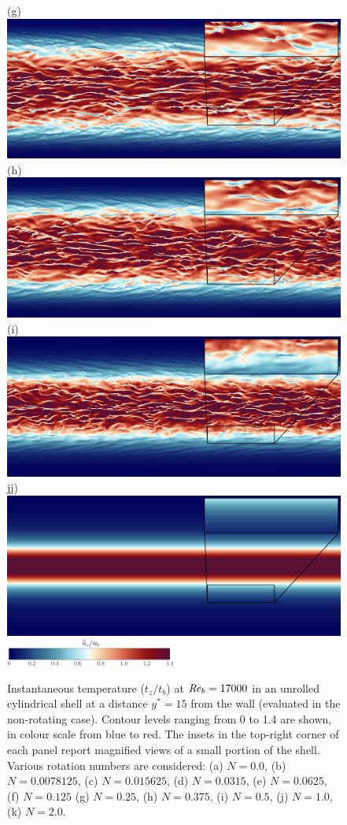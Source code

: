 \documentclass[lineno]{jfm}
\begin{document}
\begin{figure}
                (g) \includegraphics[width=6.cm]{Figures/unrolled_rotz0_roty0.1875_T.png} \\ 
                (h) \includegraphics[width=6.cm]{Figures/unrolled_rotz0_roty0.25_T.png} 
                (i) \includegraphics[width=6.cm]{Figures/unrolled_rotz0_roty0.5_T.png} \\
                jj) \includegraphics[width=6.cm]{Figures/unrolled_rotz0_roty1.0_T.png} 
		\\ \includegraphics[width=0.5\textwidth]{Figures/uz_cmap.eps}
		\caption{
			Instantaneous temperature ($t_z/t_b$) at $\mbox{\textit{Re}}_b = 17000$
			in an unrolled cylindrical shell at a distance
			$y^*=15$ from the wall (evaluated in the non-rotating case).
			Contour levels ranging from 0 to 1.4 are shown,
			in colour scale from blue to red. 
			The insets in the top-right corner of each panel report magnified views of a small portion of the shell.
			Various rotation numbers are considered:
                        (a) $N = 0.0$,
                        (b) $N = 0.0078125$,
                        (c) $N = 0.015625$,
                        (d) $N = 0.0315$,
                        (e) $N = 0.0625$,
                        (f) $N = 0.125$
                        (g) $N = 0.25$,
                        (h) $N = 0.375$,
                        (i) $N = 0.5$,
                        (j) $N = 1.0$,
                        (k) $N = 2.0$.
		    }
			\label{fig:ttz_3000} 
	\end{figure}
	 
\end{document}
